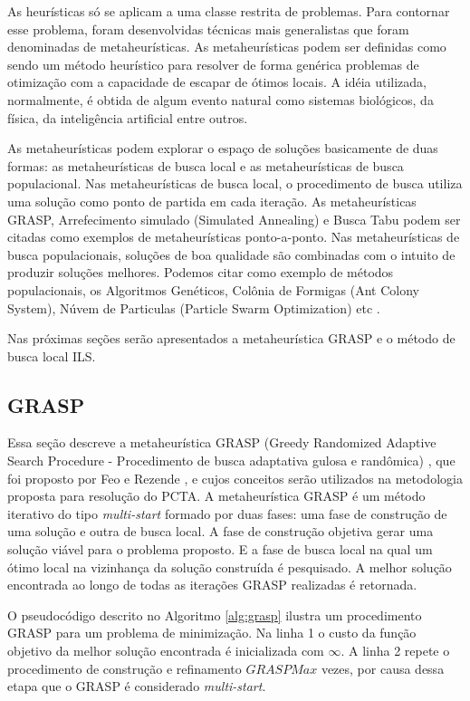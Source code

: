 As heurísticas só se aplicam a uma classe restrita de problemas. Para contornar esse problema, foram desenvolvidas técnicas mais generalistas que foram denominadas de metaheurísticas. As metaheurísticas podem ser definidas como sendo um método heurístico para resolver de forma genérica problemas de otimização com a capacidade de escapar de ótimos locais. A idéia utilizada, normalmente, é obtida de algum evento natural como sistemas biológicos, da física, da inteligência artificial entre outros.

As metaheurísticas podem explorar o espaço de soluções basicamente de duas formas: as metaheurísticas de busca local e as metaheurísticas de busca populacional. Nas metaheurísticas de busca local, o procedimento de busca utiliza uma solução como ponto de partida em cada iteração. As metaheurísticas GRASP, Arrefecimento simulado (Simulated Annealing) e Busca Tabu podem ser citadas como exemplos de metaheurísticas ponto-a-ponto. Nas metaheurísticas de busca populacionais, soluções de boa qualidade são combinadas com o intuito de produzir soluções melhores. Podemos citar como exemplo de métodos populacionais, os Algoritmos Genéticos, Colônia de Formigas (Ant Colony System), Núvem de Particulas (Particle Swarm Optimization) etc \cite{maritan2009}.

Nas próximas seções serão apresentados a metaheurística GRASP e o método de busca local ILS.

\subsection{GRASP}

Essa seção descreve a metaheurística GRASP (Greedy Randomized Adaptive Search Procedure - Procedimento de busca adaptativa gulosa e randômica) , que foi  proposto por Feo e Rezende \cite{resende1995}, e cujos conceitos serão utilizados na metodologia proposta para resolução do PCTA.
A metaheurística GRASP é um método iterativo do tipo \textit{multi-start} formado por duas fases: uma fase de construção de uma solução e outra de busca local. A fase de construção objetiva gerar uma solução viável para o problema proposto. E a fase de busca local na qual um ótimo local na vizinhança da solução construída é pesquisado. A melhor solução encontrada ao longo de todas as iterações GRASP realizadas é retornada.

O pseudocódigo descrito no Algoritmo \ref{alg:grasp} ilustra um procedimento GRASP para um problema de minimização. Na linha 1 o custo da função objetivo da melhor solução encontrada é inicializada com $\infty$. A linha 2 repete o procedimento de construção e refinamento $GRASPMax$ vezes, por causa dessa etapa que o GRASP é considerado \textit{multi-start}.

